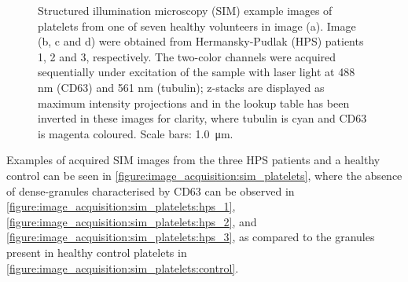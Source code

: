 \begin{figure}[htbp]\centering
	\begin{subfigure}[b]{0.49\linewidth}
		\centering
		\caption{}
		\label{figure:image_acquisition:sim_platelets:control}
	\end{subfigure}
	\begin{subfigure}[b]{0.49\linewidth}
		\centering
		\caption{}
		\label{figure:image_acquisition:sim_platelets:hps_1}
	\end{subfigure}
	\begin{subfigure}[b]{0.49\linewidth}
		\centering
		\caption{}
		\label{figure:image_acquisition:sim_platelets:hps_2}
	\end{subfigure}
	\begin{subfigure}[b]{0.49\linewidth}
		\centering
		\caption{}
		\label{figure:image_acquisition:sim_platelets:hps_3}
	\end{subfigure}
	\caption[Structured illumination microscopy images of platelets]{Structured illumination microscopy (SIM) example images of platelets from one of seven healthy volunteers in image (a). Image (b, c and d) were obtained from Hermansky-Pudlak (HPS) patients 1, 2 and 3, respectively. The two-color channels were acquired sequentially under excitation of the sample with laser light at 488 nm (CD63) and 561 nm (tubulin); z-stacks are displayed as maximum intensity projections and in the lookup table has been inverted in these images for clarity, where tubulin is cyan and CD63 is magenta coloured. Scale bars: \SI{1.0}{\micro\meter}.}
	\label{figure:image_acquisition:sim_platelets}
\end{figure}

Examples of acquired SIM images from the three HPS patients and a healthy control can be seen in \autoref{figure:image_acquisition:sim_platelets}, where the absence of dense-granules characterised by CD63 can be observed in \autoref{figure:image_acquisition:sim_platelets:hps_1}, \autoref{figure:image_acquisition:sim_platelets:hps_2}, and \autoref{figure:image_acquisition:sim_platelets:hps_3}, as compared to the granules present in healthy control platelets in \autoref{figure:image_acquisition:sim_platelets:control}.


